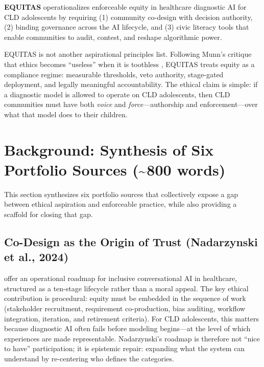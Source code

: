 \begin{tcolorbox}[colback=noteback,colframe=noteborder,title=\textbf{Thesis}]
\textbf{EQUITAS} operationalizes enforceable equity in healthcare diagnostic AI for CLD adolescents by requiring (1) community co-design with decision authority, (2) binding governance across the AI lifecycle, and (3) civic literacy tools that enable communities to audit, contest, and reshape algorithmic power.
\end{tcolorbox}

EQUITAS is not another aspirational principles list. Following Munn’s critique that ethics becomes ``useless'' when it is toothless \citep{Munn2023}, EQUITAS treats equity as a compliance regime: measurable thresholds, veto authority, stage-gated deployment, and legally meaningful accountability. The ethical claim is simple: if a diagnostic model is allowed to operate on CLD adolescents, then CLD communities must have both \emph{voice} and \emph{force}—authorship and enforcement—over what that model does to their children.


\newpage
\section{Background: Synthesis of Six Portfolio Sources (\texorpdfstring{\textasciitilde}{~}800 words)}

This section synthesizes six portfolio sources that collectively expose a gap between ethical aspiration and enforceable practice, while also providing a scaffold for closing that gap.

\subsection{Co-Design as the Origin of Trust (Nadarzynski et al., 2024)}
\citet{Nadarzynski2024} offer an operational roadmap for inclusive conversational AI in healthcare, structured as a ten-stage lifecycle rather than a moral appeal. The key ethical contribution is procedural: equity must be embedded in the sequence of work (stakeholder recruitment, requirement co-production, bias auditing, workflow integration, iteration, and retirement criteria). For CLD adolescents, this matters because diagnostic AI often fails before modeling begins—at the level of which experiences are made representable. Nadarzynski’s roadmap is therefore not ``nice to have'' participation; it is epistemic repair: expanding what the system can understand by re-centering who defines the categories.

